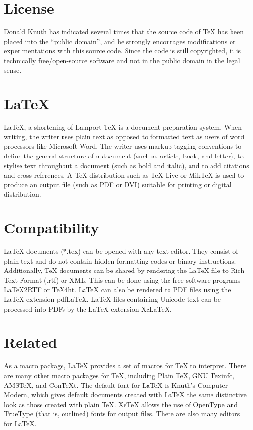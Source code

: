 \documentclass{report}
\begin{document}
\section{License}
Donald Knuth has indicated several times that the source code of TeX has
been placed into the ``public domain'', and he strongly encourages
modifications or experimentations with this source code. Since the code
is still copyrighted, it is technically free/open-source software and
not in the public domain in the legal sense.

\section{LaTeX}
\LaTeX{}, a shortening of Lamport \TeX{} is a document preparation
system. When writing, the writer uses plain text as opposed to
formatted text as users of word processors like Microsoft Word. The
writer uses markup tagging conventions to define the general structure
of a document (such as article, book, and letter), to stylise text
throughout a document (such as bold and italic), and to add citations
and cross-references. A \TeX{} distribution such as \TeX{} Live or
MikTeX is used to produce an output file (such as PDF or DVI) suitable
for printing or digital distribution.

\section{Compatibility}
\LaTeX{} documents (*.tex) can be opened with any text editor. They
consist of plain text and do not contain hidden formatting codes or
binary instructions. Additionally, \TeX{} documents can be shared by
rendering the \LaTeX{} file to Rich Text Format (.rtf) or XML. This can
be done using the free software programs LaTeX2RTF or TeX4ht. \LaTeX{}
can also be rendered to PDF files using the \LaTeX{} extension pdfLaTeX.
\LaTeX{} files containing Unicode text can be processed into PDFs by the
\LaTeX{} extension XeLaTeX.

\section{Related}
As a macro package, \LaTeX{} provides a set of macros for \TeX{} to
interpret. There are many other macro packages for \TeX{}, including
Plain \TeX{}, GNU Texinfo, AMSTeX, and ConTeXt. The default font for
\LaTeX{} is Knuth's Computer Modern, which gives default documents
created with \LaTeX{} the same distinctive look as those created with
plain \TeX{}. XeTeX allows the use of OpenType and TrueType (that is,
outlined) fonts for output files. There are also many editors for
\LaTeX{}.
\end{document}
